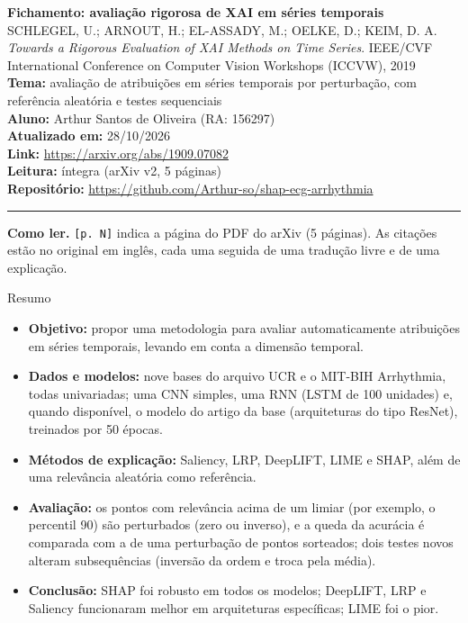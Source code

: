 \documentclass[11pt,a4paper]{article}
\begin{document}
\sloppy

\begin{center}
    {\LARGE \textbf{Fichamento: avaliação rigorosa de XAI em séries temporais}} \\[0.35em]
    {\large SCHLEGEL, U.; ARNOUT, H.; EL-ASSADY, M.; OELKE, D.; KEIM, D. A. \textit{Towards a Rigorous Evaluation of XAI Methods on Time Series}. IEEE/CVF International Conference on Computer Vision Workshops (ICCVW), 2019} \\[0.3em]
    \textbf{Tema:} avaliação de atribuições em séries temporais por perturbação, com referência aleatória e testes sequenciais \\[0.2em]
    \textbf{Aluno:} Arthur Santos de Oliveira (RA: 156297) \\[0.2em]
    \textbf{Atualizado em:} 28/10/2026 \\[0.2em]
    \textbf{Link:} \url{https://arxiv.org/abs/1909.07082} \\[0.2em]
    \textbf{Leitura:} íntegra (arXiv v2, 5 páginas) \\[0.2em]
    \textbf{Repositório:} \url{https://github.com/Arthur-so/shap-ecg-arrhythmia}
\end{center}
\vspace{-0.5em}
\hrule
\vspace{0.8em}

\textbf{Como ler.} \texttt{[p. N]} indica a página do PDF do arXiv (5 páginas). As citações estão no original em inglês, cada uma seguida de uma tradução livre e de uma explicação.

\begin{infobox}[note]{Resumo}
\begin{itemize}
\item \textbf{Objetivo:} propor uma metodologia para avaliar automaticamente atribuições em séries temporais, levando em conta a dimensão temporal.
\item \textbf{Dados e modelos:} nove bases do arquivo UCR e o MIT-BIH Arrhythmia, todas univariadas; uma CNN simples, uma RNN (LSTM de 100 unidades) e, quando disponível, o modelo do artigo da base (arquiteturas do tipo ResNet), treinados por 50 épocas.
\item \textbf{Métodos de explicação:} Saliency, LRP, DeepLIFT, LIME e SHAP, além de uma relevância aleatória como referência.
\item \textbf{Avaliação:} os pontos com relevância acima de um limiar (por exemplo, o percentil 90) são perturbados (zero ou inverso), e a queda da acurácia é comparada com a de uma perturbação de pontos sorteados; dois testes novos alteram subsequências (inversão da ordem e troca pela média).
\item \textbf{Conclusão:} SHAP foi robusto em todos os modelos; DeepLIFT, LRP e Saliency funcionaram melhor em arquiteturas específicas; LIME foi o pior.
\end{itemize}
\end{infobox}
\end{document}
